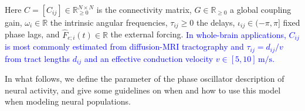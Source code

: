 \documentclass[12pt]{article}
\numberwithin{equation}{section}
\newcommand{\rev}[1]{\textcolor{blue}{#1}}
\begin{document}
Here $C=[C_{ij}]\in\mathbb{R}_{\ge 0}^{N\times N}$ is the connectivity matrix, $G\in\mathbb{R}_{\ge 0}$ a global coupling gain, $\omega_i\in\mathbb{R}$ the intrinsic angular frequencies, $\tau_{ij}\ge 0$ the delays, $\iota_{ij}\in(-\pi,\pi]$ fixed phase lags, and $\hat F_{e;i}(t)\in\mathbb{R}$ the external forcing.
\rev{In whole-brain applications, $C_{ij}$ is most commonly estimated from diffusion-MRI tractography and $\tau_{ij} = d_{ij}/v$ from tract lengths $d_{ij}$ and an effective conduction velocity $v\in[5,10]\,\mathrm{m/s}$.}
 


  

In what follows, we define the parameter of the phase oscillator description of neural activity, and give some guidelines on when and how to use this model when modeling neural populations.
\end{document}
